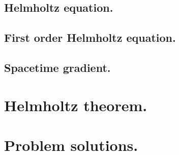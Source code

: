       \subsection{Helmholtz equation.}
         
      \subsection{First order Helmholtz equation.}
         
      \subsection{Spacetime gradient.}
         
   \section{Helmholtz theorem.}
      
      
   \section{Problem solutions.}
      \shipoutAnswer
